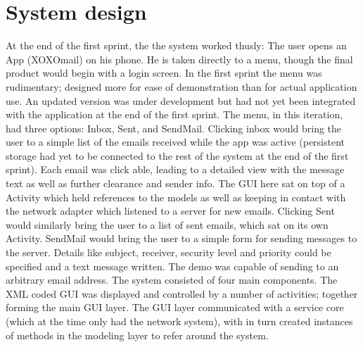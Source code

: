 \section{System design}
At the end of the first sprint, the the system worked thusly: The user opens an App (XOXOmail) on his phone. He is taken directly to a menu, though the final product would begin with a login screen. In the first sprint the menu was rudimentary; designed more for ease of demonstration than for actual application use. An updated version was under development but had not yet been integrated with the application at the end of the first sprint. The menu, in this iteration, had three options: Inbox, Sent, and SendMail.
\newline
\newline
Clicking inbox would bring the user to a simple list of the emails received while the app was active (persistent storage had yet to be connected to the rest of the system at the end of the first sprint). Each email was click able, leading to a detailed view with the message text as well as further clearance and sender info. The GUI here sat on top of a Activity which held references to the models as well as keeping in contact with the network adapter which listened to a server for new emails. Clicking Sent would similarly bring the user to a list of sent emails, which sat on its own Activity.
\newline
\newline
SendMail would bring the user to a simple form for sending messages to the server. Details like subject, receiver, security level and priority could be specified and a text message written. The demo was capable of sending to an arbitrary email address.
\newline
\newline
The system consisted of four main components. The XML coded GUI was displayed and controlled by a number of activities; together forming the main GUI layer. The GUI layer communicated with a service core (which at the time only had the network system), with in turn created instances of methods in the modeling layer to refer around the system.

